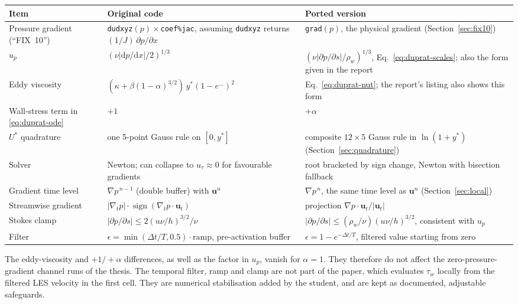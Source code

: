 \documentclass[11pt,a4paper]{article}
\newcommand{\code}[1]{\texttt{#1}}
\newcommand{\up}{u_p}
\newcommand{\utau}{u_\tau}
\newcommand{\dpds}{\partial p/\partial s}
\begin{document}
\begin{center}
\small
\begin{longtable}{@{}p{}p{}p{}@{}}
\toprule
Item & Original code & Ported version \\
\midrule
\endhead
Pressure gradient (``FIX~10'') &
  \code{dudxyz}$(p)\times$\code{coef\%jac}, assuming \code{dudxyz} returns
  $(1/J)\,\partial p/\partial x$ &
  \code{grad}$(p)$, the physical gradient
  (Section~\ref{sec:fix10}) \\
$\up$ & $(\nu|\mathrm{d}p/\mathrm{d}x|/2)^{1/3}$ &
  $(\nu|\dpds|/\rho_w)^{1/3}$, Eq.~\eqref{eq:duprat-scales};
  also the form given in the report \\
Eddy viscosity & $(\kappa + \beta(1-\alpha)^{3/2})\,y^*(1-e^{\ldots})^2$ &
  Eq.~\eqref{eq:duprat-nut}; the report's listing also shows this form \\
Wall-stress term in \eqref{eq:duprat-ode} & $+1$ & $+\alpha$ \\
$U^*$ quadrature & one 5-point Gauss rule on $[0, y^*]$ &
  composite $12\times5$ Gauss rule in $\ln(1+y^*)$
  (Section~\ref{sec:quadrature}) \\
Solver & Newton; can collapse to $\utau\approx0$ for favourable gradients &
  root bracketed by sign change, Newton with bisection fallback \\
Gradient time level & $\nabla p^{\,n-1}$ (double buffer) with $\mathbf{u}^n$ &
  $\nabla p^{\,n}$, the same time level as $\mathbf{u}^n$
  (Section~\ref{sec:local}) \\
Streamwise gradient & $|\nabla_t p|\cdot\operatorname{sign}(\nabla_t p\cdot\mathbf{u}_t)$ &
  projection $\nabla p\cdot\mathbf{u}_t/|\mathbf{u}_t|$ \\
Stokes clamp & $|\dpds| \le 2(u\nu/h)^{3/2}/\nu$ &
  $|\dpds| \le (\rho_w/\nu)(u\nu/h)^{3/2}$, consistent with $\up$ \\
Filter & $\epsilon = \min(\Delta t/T, 0.5)\cdot\text{ramp}$, pre-activation buffer &
  $\epsilon = 1 - e^{-\Delta t/T}$, filtered value starting from zero \\
\bottomrule
\end{longtable}
\end{center}

\noindent The eddy-viscosity and $+1/+\alpha$ differences, as well as the
factor in $\up$, vanish for $\alpha = 1$. They therefore do not affect the
zero-pressure-gradient channel runs of the thesis. The temporal filter,
ramp and clamp are not part of the paper, which evaluates $\tau_w$ locally
from the filtered LES velocity in the first cell. They are numerical
stabilisation added by the student, and are kept as documented, adjustable
safeguards.
\end{document}
